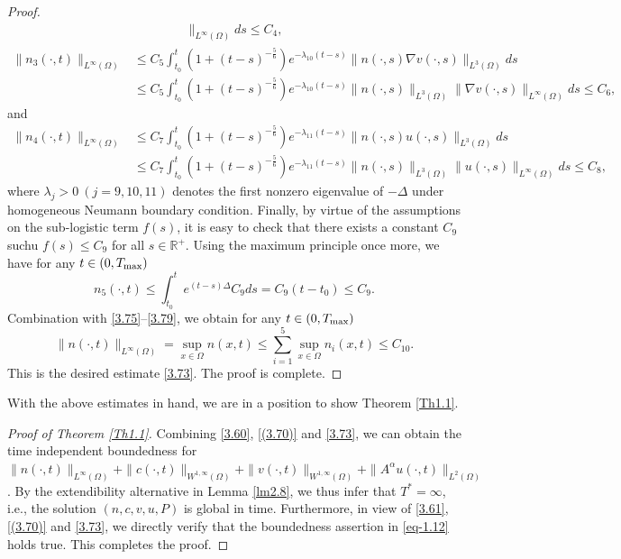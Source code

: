 \documentclass[reqno]{amsart}
\begin{document}
\begin{proof}
\begin{equation}
\begin{aligned}
 \|_{L^\infty(\Omega)} ds \leq C_{4},
\end{aligned}
\end{equation}
\begin{equation}
\begin{aligned}\label{3.77}
\| n_3(\cdot,t) \|_{L^\infty(\Omega)}
&\leq C_{5} \int_{t_0}^t ( 1 + (t - s)^{-\frac{5}{6}} ) e^{-\lambda_{10} (t-s)} \| n(\cdot, s) \nabla v(\cdot, s) \|_{L^{3}(\Omega)} ds \\
&\leq C_{5} \int_{t_0}^t ( 1 + (t - s)^{-\frac{5}{6}} ) e^{-\lambda_{10} (t-s)} \| n(\cdot, s) \|_{L^3(\Omega)} \| \nabla v(\cdot, s)
\|_{L^\infty(\Omega)} ds \leq C_{6},
\end{aligned}
\end{equation}
and
\begin{equation}
\begin{aligned}\label{3.78}
\| n_4(\cdot,t) \|_{L^\infty(\Omega)}
&\leq C_{7} \int_{t_0}^t ( 1 + (t - s)^{-\frac{5}{6}} ) e^{-\lambda_{11} (t - s)} \| n(\cdot, s) u(\cdot, s) \|_{L^3(\Omega)} ds \\
&\leq C_{7} \int_{t_0}^t ( 1 + (t - s)^{-\frac{5}{6}} ) e^{-\lambda_{11} (t - s)} \| n(\cdot, s) \|_{L^3(\Omega)} \| u(\cdot, s) \|_{L^\infty(\Omega)} ds
\leq C_{8},
\end{aligned}
\end{equation}
where $\lambda_j > 0  \ (j = 9, 10, 11) $ denotes the first nonzero eigenvalue of
 $-\Delta$ under homogeneous Neumann boundary condition.
Finally, by virtue of the assumptions on the sub-logistic term $f(s)$, 
it is easy to check that there exists a constant $C_9$ suchu $f(s) \leq C_9 $ for 
all \( s \in \mathbb{R}^+ \). Using the maximum principle once more, we have for any 
$t\in (0,T_{\rm max})$
\begin{equation}\label{3.79}
n_5(\cdot, t) \leq \int_{t_0}^t e^{(t-s)\Delta} C_9 ds = C_9(t - t_0) \leq C_9.
\end{equation}
Combination with \eqref{3.75}--\eqref{3.79}, we obtain for any $t\in (0,T_{\rm max})$
\[
\|n(\cdot, t)\|_{L^\infty(\Omega)} = \sup_{x\in\Omega} n(x,t) 
\leq \sum^5_{i=1}\sup_{x\in\Omega} n_i(x,t)\leq C_{10}.
\]
This is the desired estimate \eqref{3.73}. The proof is complete.
\end{proof}

With the above estimates in hand, we are in a position to show Theorem \ref{Th1.1}.

\begin{proof}[Proof of Theorem \ref{Th1.1}]
Combining \eqref{3.60}, \eqref{(3.70)} and \eqref{3.73}, we can obtain the time 
independent boundedness for 
$\|n(\cdot, t)\|_{L^\infty(\Omega)} + \|c(\cdot, t)\|_{W^{1,\infty}(\Omega)} 
+ \|v(\cdot, t)\|_{W^{1,\infty}(\Omega)}+ \|A^\alpha u (\cdot, t)\|_{L^2(\Omega)}$. 
By the extendibility alternative in Lemma \ref{lm2.8}, we thus infer that $T^*=\infty$, 
i.e., the solution $(n, c, v, u, P)$ is global in time. Furthermore, in view of 
\eqref{3.61}, \eqref{(3.70)} and \eqref{3.73},  we directly verify that the boundedness 
assertion in \eqref{eq-1.12} holds true. This completes the proof.
\end{proof}
\end{document}

